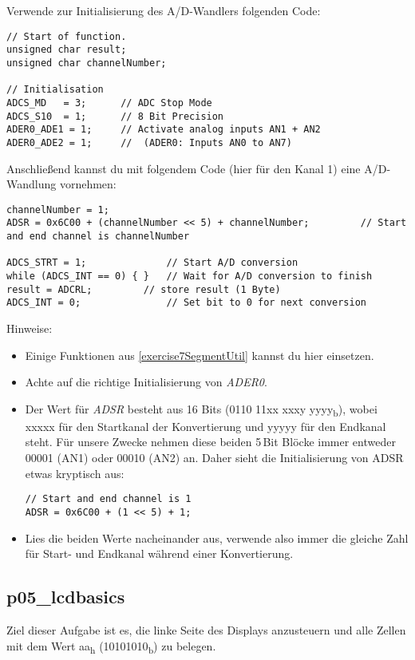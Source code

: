 Verwende zur Initialisierung des A/D-Wandlers folgenden Code:
\begin{lstlisting}
// Start of function.
unsigned char result;
unsigned char channelNumber;

// Initialisation
ADCS_MD   = 3;		// ADC Stop Mode
ADCS_S10  = 1;		// 8 Bit Precision
ADER0_ADE1 = 1;	    // Activate analog inputs AN1 + AN2
ADER0_ADE2 = 1;     //  (ADER0: Inputs AN0 to AN7)
\end{lstlisting}
Anschließend kannst du mit folgendem Code (hier für den Kanal 1) eine A/D-Wandlung vornehmen:
\begin{lstlisting}
channelNumber = 1;
ADSR = 0x6C00 + (channelNumber << 5) + channelNumber;	      // Start and end channel is channelNumber

ADCS_STRT = 1;				// Start A/D conversion
while (ADCS_INT == 0) { }	// Wait for A/D conversion to finish
result = ADCRL;			// store result (1 Byte)
ADCS_INT = 0;				// Set bit to 0 for next conversion
\end{lstlisting}

Hinweise:
\begin{itemize}
\item 
Einige Funktionen aus \ref{exercise7SegmentUtil} kannst du hier einsetzen.

\item 
Achte auf die richtige Initialisierung von \textit{ADER0}.

\item Der Wert für \textit{ADSR} besteht aus 16 Bits (0110 11xx xxxy yyyy\textsubscript{b}), wobei xxxxx für den Startkanal der Konvertierung und yyyyy für den Endkanal steht. Für unsere Zwecke nehmen diese beiden 5\,Bit Blöcke immer entweder 00001 (AN1) oder 00010 (AN2) an.
Daher sieht die Initialisierung von ADSR etwas kryptisch aus:
\begin{verbatim}
// Start and end channel is 1
ADSR = 0x6C00 + (1 << 5) + 1;
\end{verbatim}

\item
Lies die beiden Werte nacheinander aus, verwende also immer die gleiche Zahl für Start- und Endkanal während einer Konvertierung.

\end{itemize}

\subsection{p05\_lcdbasics}
Ziel dieser Aufgabe ist es, die linke Seite des Displays anzusteuern und alle Zellen mit dem Wert aa\textsubscript{h} (10101010\textsubscript{b}) zu belegen.

